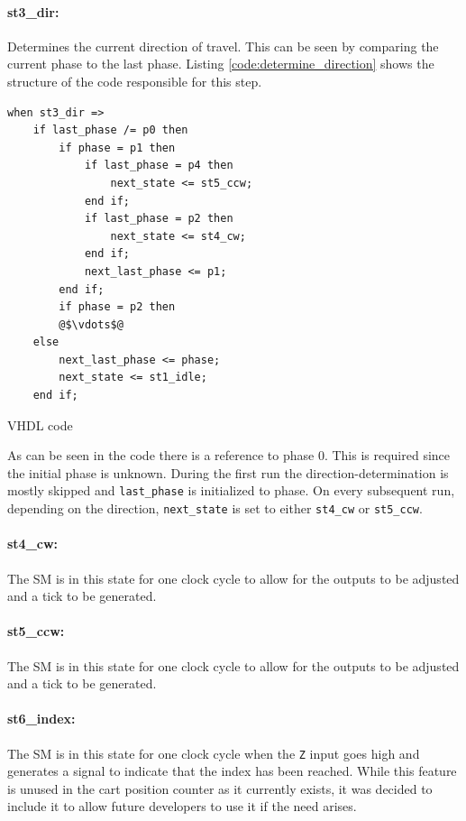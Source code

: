 \paragraph{st3\_dir:} %
Determines the current direction of travel.
This can be seen by comparing the current phase to the last phase.
Listing \ref{code:determine_direction} shows the structure of the code responsible for this step.
\begin{listing}[h]
\begin{verbatim}
when st3_dir =>
	if last_phase /= p0 then
	    if phase = p1 then
	        if last_phase = p4 then
	            next_state <= st5_ccw;
	        end if;
	        if last_phase = p2 then
	            next_state <= st4_cw;
	        end if;
	        next_last_phase <= p1;
	    end if;
	    if phase = p2 then
	    @$\vdots$@
    else
        next_last_phase <= phase;
        next_state <= st1_idle;
    end if;
\end{verbatim}
\caption{VHDL code}
\label{code:determine_direction}
\end{listing}
As can be seen in the code there is a reference to phase 0.
This is required since the initial phase is unknown.
During the first run the direction-determination is mostly skipped and \texttt{last\_phase} is initialized to phase.
On every subsequent run, depending on the direction, \texttt{next\_state} is set to either \texttt{st4\_cw} or \texttt{st5\_ccw}.
\paragraph{st4\_cw:} %
The SM is in this state for one clock cycle to allow for the outputs to be adjusted and a tick to be generated.
\paragraph{st5\_ccw:} %
The SM is in this state for one clock cycle to allow for the outputs to be adjusted and a tick to be generated.
\paragraph{st6\_index:} %
The SM is in this state for one clock cycle when the \texttt{Z} input goes high and generates a signal to indicate that the index has been reached.
While this feature is unused in the cart position counter as it currently exists, it was decided to include it to allow future developers to use it if the need arises.

